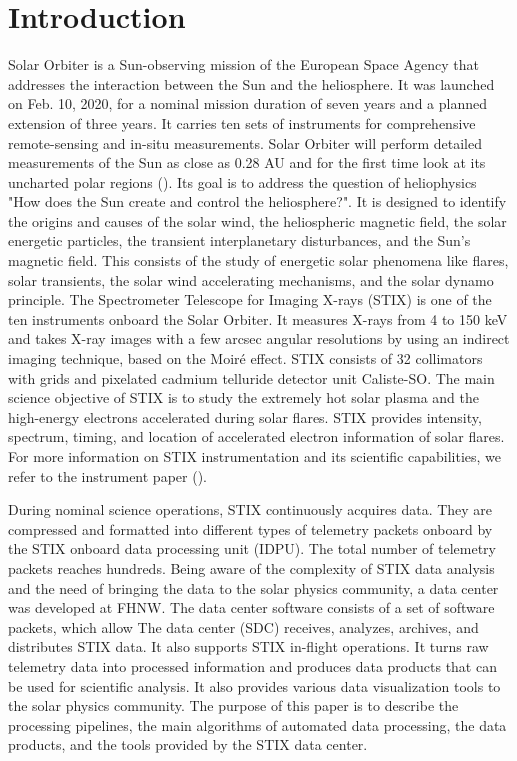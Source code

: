 \documentclass[referee]{aa} %
\begin{document}
\section{Introduction}
Solar Orbiter is a Sun-observing mission of the European Space Agency that 
addresses the interaction between the Sun and the heliosphere.
It was launched on Feb. 10, 2020, for a nominal mission duration of seven years and a planned 
extension of three years. It carries ten sets of instruments for comprehensive
remote-sensing and in-situ measurements. 
Solar Orbiter will perform detailed measurements of the Sun as close as 0.28 AU and for the first time look at its uncharted polar regions (\cite{SolarOrbiter2020}).  
Its goal is to address the question of heliophysics  "How does the Sun create and control the heliosphere?".  It is designed to identify the origins and causes of the solar wind, the heliospheric magnetic field, the solar energetic particles, the transient interplanetary disturbances, and the Sun's magnetic field.
This consists of the study of energetic solar phenomena like flares,  solar transients,  the solar wind accelerating mechanisms, and the solar dynamo principle.  
The Spectrometer Telescope for Imaging X-rays (STIX) is one of the ten instruments onboard the Solar Orbiter.  
It measures X-rays from 4 to 150 keV and takes X-ray images with a few arcsec angular resolutions by using an indirect imaging technique,
based on the Moiré effect.  STIX consists of 32 collimators with grids and pixelated cadmium telluride detector unit Caliste-SO. 
The main science objective of STIX is to study the extremely hot solar plasma and the high-energy electrons accelerated during solar flares. STIX provides intensity,  spectrum, timing, and location of accelerated electron information of solar flares.
For more information on STIX instrumentation and its scientific capabilities, we refer to the instrument paper (\cite{StixInstrument}).


During nominal science operations, STIX continuously acquires data. They are compressed and formatted into different types of telemetry packets onboard by the 
STIX onboard data processing unit (IDPU). The total number of telemetry packets reaches hundreds. 
Being aware of the complexity of STIX data analysis and the need of bringing the data to the solar physics community, 
a data center was developed at FHNW. 
The data center software consists of a set of software packets, which allow 
The data center (SDC) receives, analyzes, archives, and distributes STIX data. 
It also supports STIX in-flight operations.
It turns raw telemetry data into processed information and produces data products that can be used for scientific analysis.
It also provides various data visualization tools to the solar physics community.
The purpose of this paper is to describe the processing pipelines, 
the main algorithms of automated data processing, the data products, and the tools provided by the STIX data center.
\end{document}
